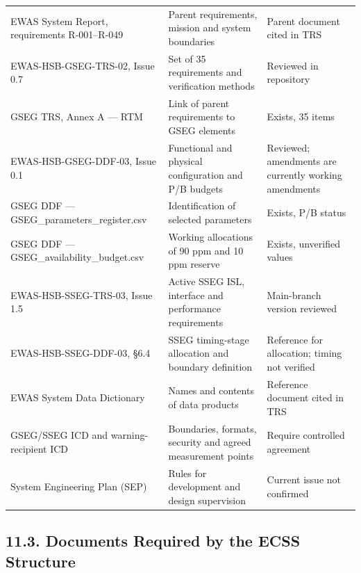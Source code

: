 \begingroup{}
\begin{longtable}{|P{0.33}|P{0.36}|P{0.31}|}
\hline{}
 &  & \\ \hline
\endhead
\hline\endlastfoot
EWAS System Report, requirements R-001–R-049 & Parent requirements, mission and system boundaries & Parent document cited in TRS\\ \hline
EWAS-HSB-GSEG-TRS-02, Issue 0.7 & Set of 35 requirements and verification methods & Reviewed in repository\\ \hline
GSEG TRS, Annex A — RTM & Link of parent requirements to GSEG elements & Exists, 35 items\\ \hline
EWAS-HSB-GSEG-DDF-03, Issue 0.1 & Functional and physical configuration and P/\allowbreak{}B budgets & Reviewed; amendments are currently working amendments\\ \hline
GSEG DDF — GSEG\_parameters\_register.csv & Identification of selected parameters & Exists, P/\allowbreak{}B status\\ \hline
GSEG DDF — GSEG\_availability\_budget.csv & Working allocations of 90 ppm and 10 ppm reserve & Exists, unverified values\\ \hline
EWAS-HSB-SSEG-TRS-03, Issue 1.5 & Active SSEG ISL, interface and performance requirements & Main-branch version reviewed\\ \hline
EWAS-HSB-SSEG-DDF-03, §6.4 & SSEG timing-stage allocation and boundary definition & Reference for allocation; timing not verified\\ \hline
EWAS System Data Dictionary & Names and contents of data products & Reference document cited in TRS\\ \hline
GSEG/\allowbreak{}SSEG ICD and warning-recipient ICD & Boundaries, formats, security and agreed measurement points & Require controlled agreement\\ \hline
System Engineering Plan (SEP) & Rules for development and design supervision & Current issue not confirmed\\*
\end{longtable}
\endgroup

\subsection{11.3. Documents Required by the ECSS Structure}\label{ddjf-11-3}

